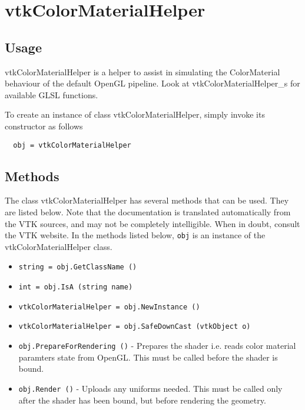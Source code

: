 \section{vtkColorMaterialHelper}

\subsection{Usage}

  vtkColorMaterialHelper is a helper to assist in simulating the
  ColorMaterial behaviour of the default OpenGL pipeline. Look at
  vtkColorMaterialHelper\_s for available GLSL functions.


To create an instance of class vtkColorMaterialHelper, simply
invoke its constructor as follows
\begin{verbatim}
  obj = vtkColorMaterialHelper
\end{verbatim}
\subsection{Methods}

The class vtkColorMaterialHelper has several methods that can be used.
  They are listed below.
Note that the documentation is translated automatically from the VTK sources,
and may not be completely intelligible.  When in doubt, consult the VTK website.
In the methods listed below, \verb|obj| is an instance of the vtkColorMaterialHelper class.
\begin{itemize}
\item  \verb|string = obj.GetClassName ()|

\item  \verb|int = obj.IsA (string name)|

\item  \verb|vtkColorMaterialHelper = obj.NewInstance ()|

\item  \verb|vtkColorMaterialHelper = obj.SafeDownCast (vtkObject o)|

\item  \verb|obj.PrepareForRendering ()| -  Prepares the shader i.e. reads color material paramters state from OpenGL. 
 This must be called before the shader is bound. 

\item  \verb|obj.Render ()| -  Uploads any uniforms needed. This must be called only
 after the shader has been bound, but before rendering the geometry.

\end{itemize}
